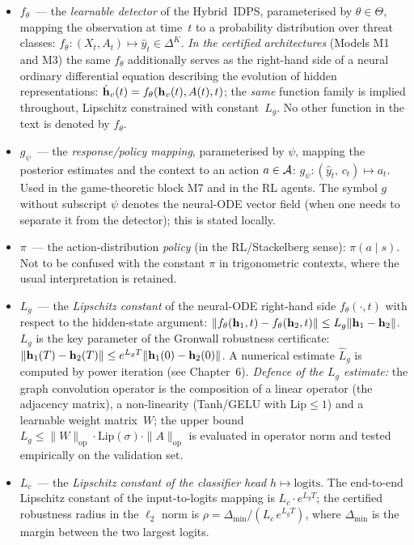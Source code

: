 \begin{itemize}[leftmargin=2em, itemsep=0pt]

\item $f_\theta$~--- the \emph{learnable detector} of the
Hybrid~IDPS, parameterised by $\theta\in\Theta$, mapping the
observation at time~$t$ to a probability distribution over threat
classes: $f_\theta:(X_t,A_t)\mapsto \hat y_t\in\Delta^{K}$. \emph{In
the certified architectures} (Models M1 and M3) the same
$f_\theta$ additionally serves as the right-hand side of a neural
ordinary differential equation describing the evolution of hidden
representations: $\dot{\mathbf{h}}_v(t)=f_\theta(\mathbf{h}_v(t),A(t),t)$; the
\emph{same} function family is implied throughout, Lipschitz
constrained with constant~$L_g$. No other function in the text
is denoted by $f_\theta$.

\item $g_\psi$~--- the \emph{response/policy mapping},
parameterised by $\psi$, mapping the posterior estimates and the
context to an action $a\in\mathcal{A}$: $g_\psi:(\hat y_t,\,c_t)\mapsto
a_t$. Used in the game-theoretic block M7 and in the RL agents.
The symbol $g$ without subscript $\psi$ denotes the neural-ODE
vector field (when one needs to separate it from the detector);
this is stated locally.

\item $\pi$~--- the action-distribution \emph{policy} (in the
RL/Stackelberg sense): $\pi(a\mid s)$. Not to be confused with the
constant $\pi$ in trigonometric contexts, where the usual
interpretation is retained.

\item $L_g$~--- the \emph{Lipschitz constant} of the neural-ODE
right-hand side $f_\theta(\cdot,t)$ with respect to the hidden-state
argument: $\|f_\theta(\mathbf{h}_1,t)-f_\theta(\mathbf{h}_2,t)\|\le L_g
\|\mathbf{h}_1-\mathbf{h}_2\|$. $L_g$ is the key parameter of the Gronwall
robustness certificate: $\|\mathbf{h}_1(T)-\mathbf{h}_2(T)\|\le e^{L_g
T}\|\mathbf{h}_1(0)-\mathbf{h}_2(0)\|$. A numerical estimate $\hat L_g$ is
computed by power iteration (see Chapter~6). \emph{Defence of the
$L_g$ estimate:} the graph convolution operator is the composition
of a linear operator (the adjacency matrix), a non-linearity
(Tanh/GELU with $\mathrm{Lip}\le 1$) and a learnable weight matrix~$W$;
the upper bound $L_g\le \|W\|_{\mathrm{op}}\cdot \mathrm{Lip}(\sigma)\cdot
\|A\|_{\mathrm{op}}$ is evaluated in operator norm and tested
empirically on the validation set.

\item $L_c$~--- the \emph{Lipschitz constant of the classifier
head} $h\mapsto\mathrm{logits}$. The end-to-end Lipschitz
constant of the input-to-logits mapping is $L_c\cdot e^{L_g T}$;
the certified robustness radius in the $\ell_2$ norm is
$\rho=\Delta_{\min}/(L_c\,e^{L_g T})$, where $\Delta_{\min}$ is
the margin between the two largest logits.


\end{itemize}
